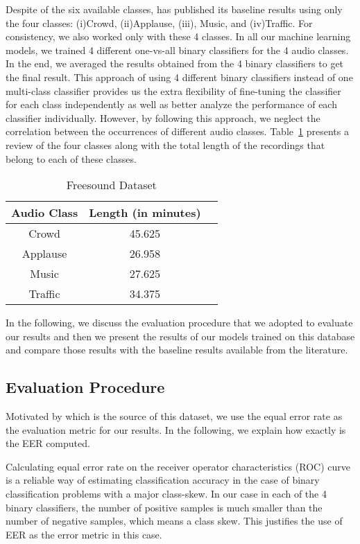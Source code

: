 Despite of the six available classes, \cite{kons2013audio} has published its baseline results using only the four classes: (i)Crowd, (ii)Applause, (iii), Music, and (iv)Traffic. For consistency, we also worked only with these 4 classes. In all our machine learning models, we trained 4 different one-vs-all binary classifiers for the 4 audio classes. In the end, we averaged the results obtained from the 4 binary classifiers to get the final result. This approach of using 4 different binary classifiers instead of one multi-class classifier provides us the extra flexibility of fine-tuning the classifier for each class independently as well as better analyze the performance of each classifier individually. However, by following this approach, we neglect the correlation between the occurrences of different audio classes. Table~\ref{tab:db2} presents a review of the four classes along with the total length of the recordings that belong to each of these classes. 

\begin{table}[tb]
\caption[Freesound dataset]{Freesound Dataset}
\label{tab:db2}
\centering
\begin{tabular}{ccc}
\toprule
Audio Class & Length (in minutes) \\ 
\midrule
Crowd	& 45.625 \\
Applause	& 26.958 \\
Music	& 27.625 \\
Traffic	& 34.375 \\
\bottomrule 
\end{tabular}
\end{table}

In the following, we discuss the evaluation procedure that we adopted to evaluate our results and then we present the results of our models trained on this database and compare those results with the baseline results available from the literature.

\subsection{Evaluation Procedure} \label{eval_proc_db2}
Motivated by \cite{kons2013audio} which is the source of this dataset, we use the equal error rate as the evaluation metric for our results. In the following, we explain how exactly is the EER computed. 

Calculating equal error rate on the receiver operator characteristics (ROC) curve \cite{bradley1997use} is a reliable way of estimating classification accuracy in the case of binary classification problems with a major class-skew. In our case in each of the 4 binary classifiers, the number of positive samples is much smaller than the number of negative samples, which means a class skew. This justifies the use of EER as the error metric in this case.

